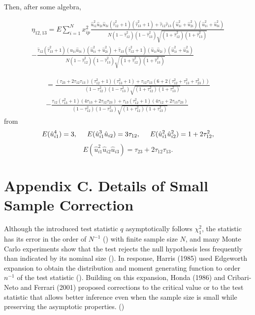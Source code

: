 \documentclass[aap,authoryear, preprint]{imsart}
\numberwithin{equation}{section}
\theoremstyle{plain}
\begin{document}
 Then, after some algebra,

\begin{equation}
    \begin{multlined}
    \eta_{12,13} = E\sum_{i=1}^{N}x_{ip}^2  \frac{\hat{u}_{i1}^2 \hat{u}_{2i}\hat{u}_{3i}(\hat{\tau}_{12}^2+1)(\hat{\tau}_{13}^2+1)
    + \hat{\tau}_{12}\hat{\tau}_{13} (\hat{u}_{1i}^2 + \hat{u}_{2i}^2)(\hat{u}_{1i}^2 + \hat{u}_{3i}^2)}{N(1-\hat{\tau}_{12}^2)(1-\hat{\tau}_{13}^2)\sqrt{(1+\hat{\tau}_{12}^2)(1+\hat{\tau}_{13}^2)}} \\
    - \frac{\hat{\tau}_{12}(\hat{\tau}_{13}^2 + 1) (\hat{u}_{1i}\hat{u}_{3i})(\hat{u}_{1i}^2 + \hat{u}_{2i}^2) + \hat{\tau}_{13}(\hat{\tau}_{12}^2+1)(\hat{u}_{1i}\hat{u}_{2i})(\hat{u}_{1i}^2 + \hat{u}_{3i}^2)}{N(1-\hat{\tau}_{12}^2)(1-\hat{\tau}_{13}^2)\sqrt{(1+\hat{\tau}_{12}^2)(1+\hat{\tau}_{13}^2)}}
    \end{multlined} 
    \end{equation}
    
\begin{equation} \begin{multlined}
= \frac{(\tau_{23}+2\tau_{12}\tau_{13})(\tau_{12}^2+1)(\tau_{13}^2+1) + \tau_{12}\tau_{13}(6+2(\tau_{12}^2+\tau_{13}^2+\tau_{23}^2))}{(1-{\tau}_{12}^2)(1-{\tau}_{13}^2)\sqrt{(1+{\tau}_{12}^2)(1+{\tau}_{13}^2)}} \\
- \frac{\tau_{12}(\tau_{13}^2+1)(4\tau_{13}+2\tau_{12}\tau_{23}) + \tau_{13}(\tau_{12}^2+1)(4\tau_{12}+2\tau_{13}\tau_{23})}{(1-{\tau}_{12}^2)(1-{\tau}_{13}^2)\sqrt{(1+{\tau}_{12}^2)(1+{\tau}_{13}^2)}}
\end{multlined} \end{equation}
from
$$E(\hat{u}_{i1}^4) = 3, \hspace{5mm} E(\hat{u}_{i1}^3 \hat{u}_{i2}) = 3\tau_{12}, \hspace{5mm} E(\hat{u}_{i1}^2\hat{u}_{i2}^2) = 1 + 2\tau_{12}^2,$$
$$E(\hat{u}_{i1}^2 \hat{u}_{i2} \hat{u}_{i3}) = \tau_{23} + 2\tau_{12}\tau_{13}.$$

\section{Appendix C. Details of Small Sample Correction}
Although the introduced test statistic $q$ asymptotically follows $\chi_1^2$, the statistic has its error in the order of $N^{-1}$ (\cite{harris1985asymptotic}) with finite sample size $N$, and many Monte Carlo experiments show that the test rejects the null hypothesis less frequently than indicated by its nominal size (\cite{godfrey1978testing, griffiths1986monte, honda1988size}). In response, Harris (1985) used Edgeworth expansion to obtain the distribution and moment generating function to order $n^{-1}$ of the test statistic (\cite{harris1985asymptotic}). Building on this expansion, Honda (1986) and Cribari-Neto and Ferrari (2001) proposed corrections to the critical value or to the test statistic that allows better inference even when the sample size is small while preserving the asymptotic properties. (\cite{cribari1995improved, cribari2001monotonic, honda1988size})\\
\end{document}

